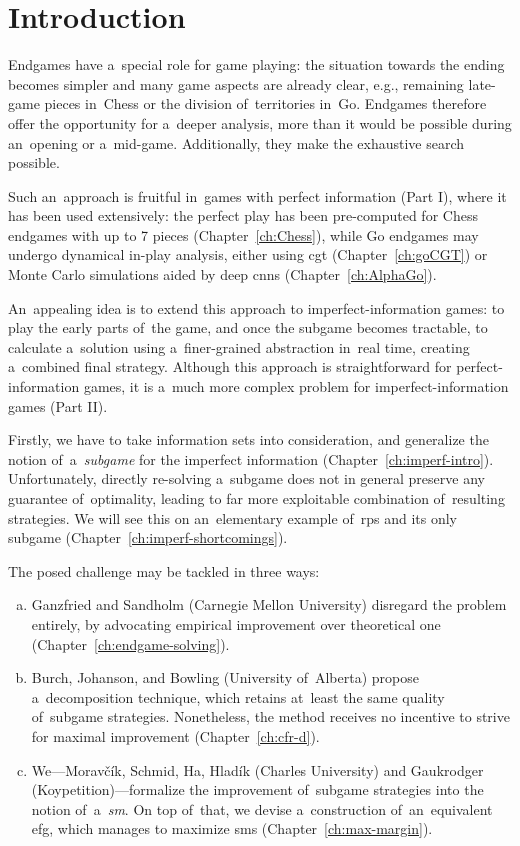 \chapter*{Introduction}
Endgames have a~special role for game playing:
the situation towards the ending becomes simpler and many game aspects are already clear, e.g., remaining late-game pieces in~Chess or the division of~territories in~Go.
Endgames therefore offer the opportunity for a~deeper analysis, more than it would be possible during an~opening or a~mid-game.
Additionally, they make the exhaustive search possible.

Such an~approach is fruitful in~games with perfect information (Part I), where it has been used extensively:
the perfect play has been pre-computed for Chess endgames with up to 7 pieces (Chapter~\ref{ch:Chess}), while Go endgames may undergo dynamical in-play analysis, either using \acrlong{cgt} (Chapter~\ref{ch:goCGT}) or Monte Carlo simulations aided by deep \acrlong{cnn}s (Chapter~\ref{ch:AlphaGo}).

An~appealing idea is to extend this approach to imperfect-information games:
to play the early parts of~the game, and once the subgame becomes tractable, to calculate a~solution using a~finer-grained abstraction in~real time, creating a~combined final strategy.
Although this approach is straightforward for perfect-information games, it is a~much more complex problem for imperfect-information games (Part II).

Firstly, we have to take information sets into consideration, and generalize the notion of~a~\emph{subgame} for the imperfect information (Chapter~\ref{ch:imperf-intro}).
Unfortunately, directly re-solving a~subgame does not in general preserve any guarantee of~optimality, leading to far more exploitable combination of~resulting strategies.
We will see this on an~elementary example of~\acrlong{rps} and its only subgame (Chapter~\ref{ch:imperf-shortcomings}).

The posed challenge may be tackled in three ways:
\begin{enumerate}[(a)]
  \item Ganzfried and Sandholm (Carnegie Mellon University) disregard the problem entirely, by advocating empirical improvement over theoretical one (Chapter~\ref{ch:endgame-solving}).
  \item Burch, Johanson, and Bowling (University of~Alberta) propose a~decomposition technique, which retains at~least the same quality of~subgame strategies.
    Nonetheless, the method receives no incentive to strive for maximal improvement (Chapter~\ref{ch:cfr-d}).
  \item We---Moravčík, Schmid, Ha, Hladík (Charles University) and Gaukrodger  (Koypetition)---formalize the improvement of~subgame strategies into the notion of~a~\emph{\acrlong{sm}}.
    On top of~that, we devise a~construction of~an~equivalent \acrlong{efg}, which manages to maximize \acrlong{sm}s (Chapter~\ref{ch:max-margin}).
\end{enumerate}
